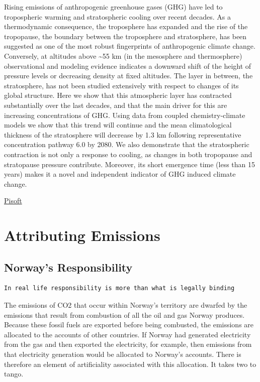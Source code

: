 \documentclass[
]{book}
\begin{document}
Rising emissions of anthropogenic greenhouse gases (GHG) have led to tropospheric warming and stratospheric cooling over recent decades. As a thermodynamic consequence, the troposphere has expanded and the rise of the tropopause, the boundary between the troposphere and stratosphere, has been suggested as one of the most robust fingerprints of anthropogenic climate change. Conversely, at altitudes above \textasciitilde55 km (in the mesosphere and thermosphere) observational and modeling evidence indicates a downward shift of the height of pressure levels or decreasing density at fixed altitudes. The layer in between, the stratosphere, has not been studied extensively with respect to changes of its global structure. Here we show that this atmospheric layer has contracted substantially over the last decades, and that the main driver for this are increasing concentrations of GHG. Using data from coupled chemistry-climate models we show that this trend will continue and the mean climatological thickness of the stratosphere will decrease by 1.3 km following representative concentration pathway 6.0 by 2080. We also demonstrate that the stratospheric contraction is not only a response to cooling, as changes in both tropopause and stratopause pressure contribute. Moreover, its short emergence time (less than 15 years) makes it a novel and independent indicator of GHG induced climate change.

\href{https://iopscience.iop.org/article/10.1088/1748-9326/abfe2b}{Pisoft}

\hypertarget{attributing-emissions}{%
\section{Attributing Emissions}\label{attributing-emissions}}

\hypertarget{norways-responsibility}{%
\subsection{Norway's Responsibility}\label{norways-responsibility}}

\begin{verbatim}
In real life responsibility is more than what is legally binding
\end{verbatim}

The emissions of CO2 that occur within Norway's territory are dwarfed by the emissions that result from combustion of all the oil and gas Norway produces. Because these fossil fuels are exported before being combusted, the emissions are allocated to the accounts of other countries. If Norway had generated electricity from the gas and then exported the electricity, for example, then emissions from that electricity generation would be allocated to Norway's accounts. There is therefore an element of artificiality associated with this allocation. It takes two to tango.
\end{document}

